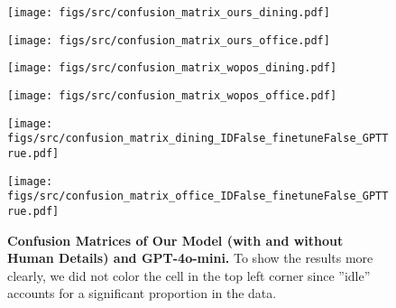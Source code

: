 \begin{figure*}[t]
    \vspace{-3.0em}

    \centering
    \begin{minipage}{0.48\textwidth}
        \centering
        \texttt{[image: figs/src/confusion\_matrix\_ours\_dining.pdf]}
        \label{fig:image1}
    \end{minipage}
    \begin{minipage}{0.48\linewidth}
        \centering
        \texttt{[image: figs/src/confusion\_matrix\_ours\_office.pdf]}
        \label{fig:image2}
    \end{minipage}

    \vspace{-1.5em}

    \begin{minipage}{0.48\textwidth}
        \centering
        \texttt{[image: figs/src/confusion\_matrix\_wopos\_dining.pdf]}
        \label{fig:image3}
    \end{minipage}
    \begin{minipage}{0.48\linewidth}
        \centering
        \texttt{[image: figs/src/confusion\_matrix\_wopos\_office.pdf]}
        \label{fig:image4}
    \end{minipage}

    \vspace{-1.5em}

    \begin{minipage}{0.48\textwidth}
        \centering
        \texttt{[image: figs/src/confusion\_matrix\_dining\_IDFalse\_finetuneFalse\_GPTTrue.pdf]}
        \label{fig:image5}
    \end{minipage}
    \begin{minipage}{0.48\linewidth}
        \centering
        \texttt{[image: figs/src/confusion\_matrix\_office\_IDFalse\_finetuneFalse\_GPTTrue.pdf]}
        \label{fig:image6}
    \end{minipage}
    
    \caption{\textbf{Confusion Matrices of Our Model (with and without Human Details) and GPT-4o-mini.} To show the results more clearly, we did not color the cell in the top left corner since ”idle” accounts for a significant proportion in the data.}
    \label{fig:Confusion Matrix}
\end{figure*}

